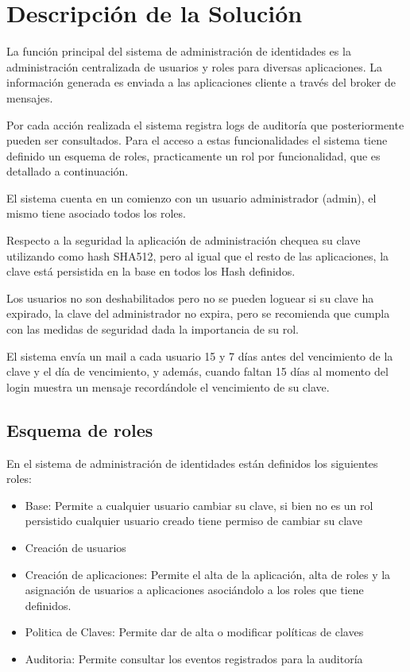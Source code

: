 \section{Descripción de la Solución}

La función principal del sistema de administración de identidades es la administración centralizada de usuarios y roles para diversas aplicaciones. La información generada es enviada a las aplicaciones cliente a través del broker de mensajes.

Por cada acción realizada el sistema registra logs de auditoría que posteriormente pueden ser consultados.
Para el acceso a estas funcionalidades el sistema tiene definido un esquema de roles, practicamente un rol por funcionalidad, que es detallado a continuación. 

El sistema cuenta en un comienzo con un usuario administrador (admin), el mismo tiene asociado todos los roles.

Respecto a la seguridad la aplicación de administración chequea su clave utilizando como hash SHA512, pero al igual que el resto de las aplicaciones, la clave está persistida en la base en todos los Hash definidos.

Los usuarios no son deshabilitados pero no se pueden loguear si su clave ha expirado, la clave del administrador no expira, pero se recomienda que cumpla con las medidas de seguridad dada la importancia de su rol.

El sistema envía un mail a cada usuario 15 y 7 días antes del vencimiento de la clave y el día de vencimiento, y además, cuando faltan 15 días al momento del login muestra un mensaje recordándole el vencimiento de su clave.  

\subsection{Esquema de roles}

En el sistema de administración de identidades están definidos los siguientes roles:

\begin{itemize}
\item Base: Permite a cualquier usuario cambiar su clave, si bien no es un rol persistido cualquier usuario creado tiene permiso de cambiar su clave
\item Creación de usuarios
\item Creación de aplicaciones: Permite el alta de la aplicación, alta de roles y la asignación de usuarios a aplicaciones asociándolo a los roles que tiene definidos.	
\item Politica de Claves: Permite dar de alta o modificar políticas de claves
\item Auditoria: Permite consultar los eventos registrados para la auditoría
\end{itemize}

